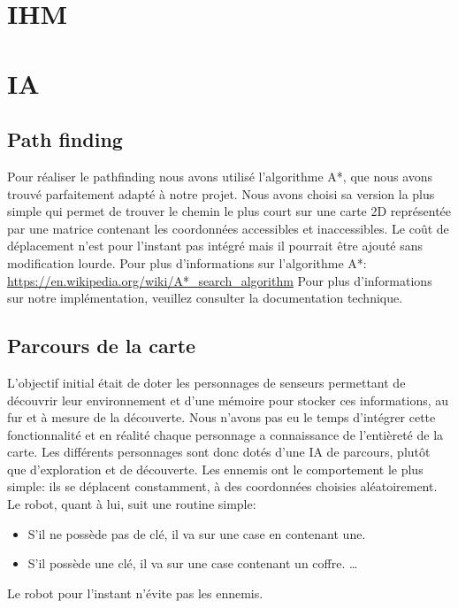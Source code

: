 \documentclass[a4paper 12pts]{article}
\begin{document}
\section{IHM}


\newpage
\section{IA}


\subsection{Path finding}
Pour réaliser le pathfinding nous avons utilisé l'algorithme A*, que nous avons trouvé parfaitement adapté à notre projet. Nous avons choisi sa version la plus simple qui permet de trouver le chemin le plus court sur une carte 2D représentée par une matrice contenant les coordonnées accessibles et inaccessibles. Le coût de déplacement n'est pour l'instant pas intégré mais il pourrait être ajouté sans modification lourde.
Pour plus d'informations sur l'algorithme A*: \url{https://en.wikipedia.org/wiki/A*_search_algorithm}
Pour plus d'informations sur notre implémentation, veuillez consulter la documentation technique.

\subsection{Parcours de la carte}
L'objectif initial était de doter les personnages de senseurs permettant de découvrir leur environnement et d'une mémoire pour stocker ces informations, au fur et à mesure de la découverte. Nous n'avons pas eu le temps d'intégrer cette fonctionnalité et en réalité chaque personnage a connaissance de l'entièreté de la carte.
Les différents personnages sont donc dotés d'une IA de parcours, plutôt que d'exploration et de découverte.
Les ennemis ont le comportement le plus simple: ils se déplacent constamment, à des coordonnées choisies aléatoirement.
Le robot, quant à lui, suit une routine simple:

\begin{itemize}
  \item S'il ne possède pas de clé, il va sur une case en contenant une.
  \item S'il possède une clé, il va sur une case contenant un coffre. \ldots
\end{itemize}  

Le robot pour l'instant n'évite pas les ennemis. 
\newpage
\end{document}
